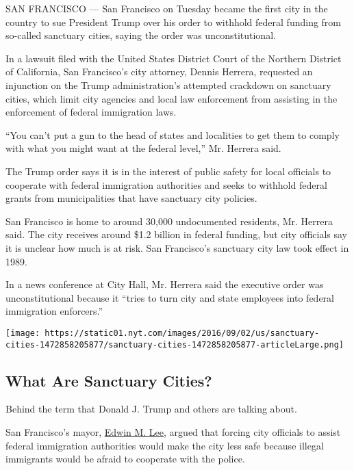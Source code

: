 SAN FRANCISCO --- San Francisco on Tuesday became the first city in the
country to sue President Trump over his order to withhold federal
funding from so-called sanctuary cities, saying the order was
unconstitutional.

In a lawsuit filed with the United States District Court of the Northern
District of California, San Francisco's city attorney, Dennis Herrera,
requested an injunction on the Trump administration's attempted
crackdown on sanctuary cities, which limit city agencies and local law
enforcement from assisting in the enforcement of federal immigration
laws.

``You can't put a gun to the head of states and localities to get them
to comply with what you might want at the federal level,'' Mr. Herrera
said.

The Trump order says it is in the interest of public safety for local
officials to cooperate with federal immigration authorities and seeks to
withhold federal grants from municipalities that have sanctuary city
policies.

San Francisco is home to around 30,000 undocumented residents, Mr.
Herrera said. The city receives around \$1.2 billion in federal funding,
but city officials say it is unclear how much is at risk. San
Francisco's sanctuary city law took effect in 1989.

In a news conference at City Hall, Mr. Herrera said the executive order
was unconstitutional because it ``tries to turn city and state employees
into federal immigration enforcers.''

\href{https://www.nytimes.com/interactive/2016/09/02/us/sanctuary-cities.html}{}

\texttt{[image: https://static01.nyt.com/images/2016/09/02/us/sanctuary-cities-1472858205877/sanctuary-cities-1472858205877-articleLarge.png]}

\hypertarget{what-are-sanctuary-cities}{%
\subsection{What Are Sanctuary
Cities?}\label{what-are-sanctuary-cities}}

Behind the term that Donald J. Trump and others are talking about.

San Francisco's mayor,
\href{https://twitter.com/mayoredlee/status/826490889623134208}{Edwin M.
Lee}, argued that forcing city officials to assist federal immigration
authorities would make the city less safe because illegal immigrants
would be afraid to cooperate with the police.

